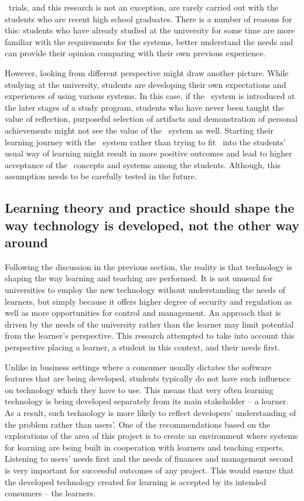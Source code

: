 \ep~trials, and this research is not an exception, are rarely carried out with
the students who are recent high school graduates. There is a number of reasons
for this: students who have already studied at the university for some time are
more familiar with the requirements for the systems, better understand the needs
and can provide their opinion comparing with their own previous experience.

However, looking from different perspective might draw another picture. While
studying at the university, students are developing their own expectations and
experiences of using various systems. In this case, if the \ep~system is
introduced at the later stages of a study program, students who have never been
taught the value of reflection, purposeful selection of artifacts and
demonstration of personal achievements might not see the value of the \ep~system
as well. Starting their learning journey with the \ep~system rather than trying
to fit \ep~into the students' usual way of learning might result in more
positive outcomes and lead to higher acceptance of the \ep~concepts and systems
among the students. Although, this assumption needs to be carefully tested in
the future.

\subsection[Shaping Technology for Learning Needs]{Learning theory and practice
should shape the way technology is developed, not the other way around}

Following the discussion in the previous section, the reality is that technology
is shaping the way learning and teaching are performed. It is not unusual for
universities to employ the new technology without understanding the needs of
learners, but simply because it offers higher degree of security and regulation
as well as more opportunities for control and management. An approach that is
driven by the needs of the university rather than the learner may limit
potential from the learner's perspective. This research attempted to take into
account this perspective placing a learner, a student in this context, and their
needs first.

Unlike in business settings where a consumer usually dictates the software
features that are being developed, students typically do not have such influence
on technology which they have to use. This means that very often learning
technology is being developed separately from its main stakeholder -- a learner.
As a result, such technology is more likely to reflect developers' understanding
of the problem rather than users'. One of the recommendations based on the
explorations of the area of this project is to create an environment where
systems for learning are being built in cooperation with learners and teaching
experts. Listening to users' needs first and the needs of finances and
management second is very important for successful outcomes of any project. This
would ensure that the developed technology created for learning is accepted  by
its intended consumers -- the learners.


